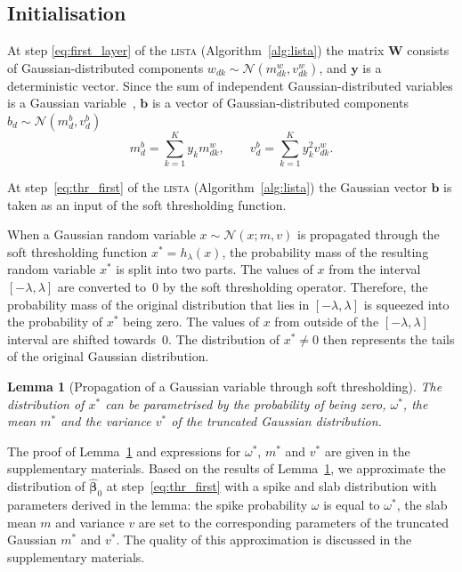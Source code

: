\documentclass{article}
\newtheorem{lemma}{Lemma}
\begin{document}
\subsection{Initialisation}
At step \ref{eq:first_layer} of the \textsc{lista} (Algorithm~\ref{alg:lista}) the matrix $\mathbf{W}$ consists of Gaussian-distributed components $w_{dk} \sim \mathcal{N}(m^w_{dk}, v^w_{dk})$, and $\mathbf{y}$ is a deterministic vector. Since the sum of independent Gaussian-distributed variables is a Gaussian variable~\cite{eisenberg2008sum}, $\mathbf{b}$ is a vector of Gaussian-distributed components $b_d \sim \mathcal{N}(m^b_d, v^b_d)$
\begin{equation}
\label{eq:matrix_vector_product}
m^b_d = \sum_{k=1}^Ky_k m^w_{dk}, \qquad
v^b_d = \sum_{k=1}^Ky_k^2v^w_{dk}.
\end{equation}

At step~\ref{eq:thr_first} of the \textsc{lista} (Algorithm~\ref{alg:lista}) the Gaussian vector $\mathbf{b}$ is taken as an input of the soft thresholding function.

When a Gaussian random variable $x \sim \mathcal{N}(x; m, v)$ is propagated through the soft thresholding function $x^* = h_{\lambda}(x)$, the probability mass of the resulting random variable $x^*$ is split into two parts. The values of $x$ from the interval $[-\lambda, \lambda]$ are converted to~$0$ by the soft thresholding operator. Therefore, the probability mass of the original distribution that lies in $[-\lambda, \lambda]$ is squeezed into the probability of $x^*$ being zero. The values of $x$ from outside of the $[-\lambda, \lambda]$ interval are shifted towards~$0$. The distribution of $x^* \neq 0$ then represents the tails of the original Gaussian distribution.

\begin{lemma}[Propagation of a Gaussian variable through soft thresholding]
\label{thm:soft_thresholding}
The distribution of $x^*$ can be parametrised by the probability of being zero, $\omega^*$, the mean $m^*$ and the variance $v^*$ of the truncated Gaussian distribution.
\end{lemma}

The proof of Lemma~\ref{thm:soft_thresholding} and expressions for $\omega^*$, $m^*$ and $v^*$ are given in the supplementary materials. Based on the results of Lemma~\ref{thm:soft_thresholding}, we approximate the distribution of $\widehat{\boldsymbol\beta}_0$ at step~\ref{eq:thr_first} with a spike and slab distribution with parameters derived in the lemma: the spike probability $\omega$ is equal to $\omega^*$, the slab mean $m$ and variance $v$ are set to the corresponding parameters of the truncated Gaussian $m^*$ and $v^*$. The quality of this approximation is discussed in the supplementary materials.
\end{document}
